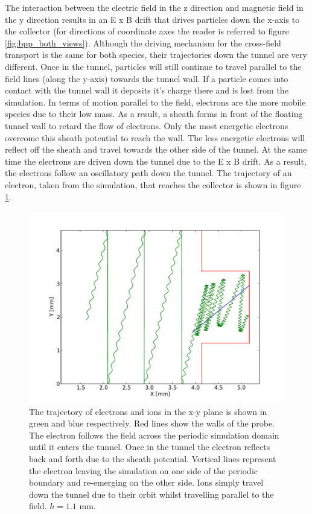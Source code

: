 The interaction between the electric field in the z direction and magnetic field in the y direction results in an E x B drift that drives particles down the x-axis to the collector (for directions of coordinate axes the reader is referred to figure \ref{fig:bpp_both_views}). Although the driving mechanism for the cross-field transport is the same for both species, their trajectories down the tunnel are very different. Once in the tunnel, particles will still continue to travel parallel to the field lines (along the y-axis) towards the tunnel wall. If a particle comes into contact with the tunnel wall it deposits it's charge there and is lost from the simulation. In terms of motion parallel to the field, electrons are the more mobile species due to their low mass.  As a result, a sheath forms in front of the floating tunnel wall to retard the flow of electrons. Only the most energetic electrons overcome this sheath potential to reach the wall. The less energetic electrons will reflect off the sheath and travel towards the other side of the tunnel. At the same time the electrons are driven down the tunnel due to the E x B drift. As a result, the electrons follow an oscillatory path down the tunnel. The trajectory of an electron, taken from the simulation, that reaches the collector is shown in figure \ref{fig:traj_e}. 
\begin{figure}[H]
	\begin{center}
		\includegraphics[width=.75\textwidth]{figure4.pdf}
		\caption{The trajectory of electrons and ions in the x-y plane is shown in green and blue respectively. Red lines show the walls of the probe. The electron follows the field across the periodic simulation domain until it enters the tunnel. Once in the tunnel the electron reflects back and forth due to the sheath potential. Vertical lines represent the electron leaving the simulation on one side of the periodic boundary and re-emerging on the other side. Ions simply travel down the tunnel due to their orbit whilst travelling parallel to the field.   $h = 1.1$ mm.  }
		\label{fig:traj_e}
	\end{center}
\end{figure}
